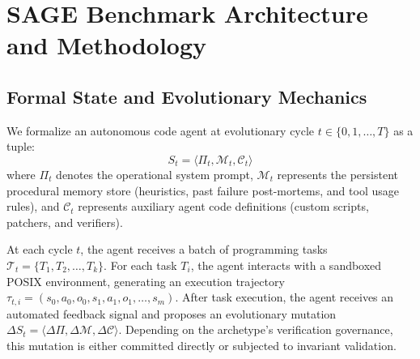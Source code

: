 \documentclass{article}
\begin{document}


\section{SAGE Benchmark Architecture and Methodology}
\label{sec:methodology}

\subsection{Formal State and Evolutionary Mechanics}
We formalize an autonomous code agent at evolutionary cycle $t \in \{0, 1, \dots, T\}$ as a tuple:
\begin{equation}
    S_t = \langle \Pi_t, \mathcal{M}_t, \mathcal{C}_t \rangle
\end{equation}
where $\Pi_t$ denotes the operational system prompt, $\mathcal{M}_t$ represents the persistent procedural memory store (heuristics, past failure post-mortems, and tool usage rules), and $\mathcal{C}_t$ represents auxiliary agent code definitions (custom scripts, patchers, and verifiers).

At each cycle $t$, the agent receives a batch of programming tasks $\mathcal{T}_t = \{T_1, T_2, \dots, T_k\}$. For each task $T_i$, the agent interacts with a sandboxed POSIX environment, generating an execution trajectory $\tau_{t,i} = (s_0, a_0, o_0, s_1, a_1, o_1, \dots, s_m)$. After task execution, the agent receives an automated feedback signal and proposes an evolutionary mutation $\Delta S_t = \langle \Delta \Pi, \Delta \mathcal{M}, \Delta \mathcal{C} \rangle$. Depending on the archetype's verification governance, this mutation is either committed directly or subjected to invariant validation.
\end{document}
